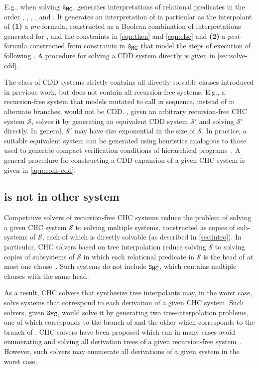 E.g., when solving $\mcchc$, \sys generates interpretations of
relational predicates in the order , , ,
, and .
%
It generates an interpretation of  in particular as the
interpolant of \textbf{(1)} a \emph{pre}-formula, constructed as a
Boolean combination of interpretations generated for , 
and the constraints in \autoref{eqn:then} and \autoref{eqn:else} and %
\textbf{(2)} a \emph{post}-formula constructed from constraints in
$\mcchc$ that model the steps of execution of  following
.
%
A procedure for solving a CDD system directly is given in
\autoref{sec:solve-cdd}.

The class of CDD systems strictly contains all directly-solvable
classes introduced in previous work, but does not contain all
recursion-free systems.
%
E.g., a recursion-free system that models  mutated to
call  in sequence, instead of in alternate branches, would not
be CDD.
%
\sys, given an arbitrary recursion-free CHC system $\mathcal{S}$,
solves it by generating an equivalent CDD system $\mathcal{S}'$ and
solving $\mathcal{S}'$ directly.
%
In general, $\mathcal{S}'$ may have size exponential in the size of
$\mathcal{S}$.
%
In practice, a suitable equivalent system can be generated using
heuristics analogous to those used to generate compact verification
conditions of hierarchical programs~\cite{flanagan01,lal-qadeer15}.
%
A general procedure for constructing a CDD expansion of a given CHC
system is given in \autoref{app:cons-cdd}.

\subsection{ is not in other system}
\label{sec:not-in}
Competitive solvers of recursion-free CHC systems reduce the problem
of solving a given CHC system $\mathcal{S}$ to solving multiple
systems, constructed as copies of sub-systems of $\mathcal{S}$, each
of which is directly solvable (as described in \autoref{sec:intro}).
%
In particular, CHC solvers based on tree interpolation reduce solving
$\mathcal{S}$ to solving copies of subsystems of $\mathcal{S}$ in
which each relational predicate in $\mathcal{S}$ is the head of at
most one clause~\cite{bjorner13,heizmann10}.
%
Such systems do not include $\mcchc$, which contains multiple clauses
with the same head.

As a result, CHC solvers that synthesize tree interpolants may, in the
worst case, solve systems that correspond to each derivation of a
given CHC system.
%
Such solvers, given $\mcchc$, would solve it by generating two
tree-interpolation problems, one of which corresponds to the 
branch of  and the other which corresponds to the
 branch of .
%
CHC solvers have been proposed which can in many cases avoid
enumerating and solving all derivation trees of a given recursion-free
system~\cite{mcmillan14}.
%
However, such solvers may enumerate all derivations of a given system
in the worst case.

